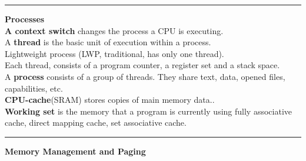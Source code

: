 \documentclass[8pt,a4paper,landscape]{article}
\newcommand{\topic}[1]{\textbf{\large #1}}
\begin{document}
\begin{spacing}{-1}
\begin{multicols*}{3}
\hrule \noindent
\topic{Processes} \\
\textbf{A context switch} changes the process a CPU is executing. \\
A \textbf{thread} is the basic unit of execution within a process. \\
Lightweight process (LWP, traditional, has only one thread). \\
Each thread, consists of a program counter, a register set and a stack space. \\
A \textbf{process} consists of a group of threads. They share text, data, opened files, capabilities, etc. \\
\textbf{CPU-cache}(SRAM) stores copies of main memory data.. \\
\textbf{Working set} is the memory that a program is currently using
fully associative cache, direct mapping cache, set associative cache. \\

\hrule \noindent
\topic{Memory Management and Paging} \\


\end{multicols*}
\end{spacing}
\end{document}
